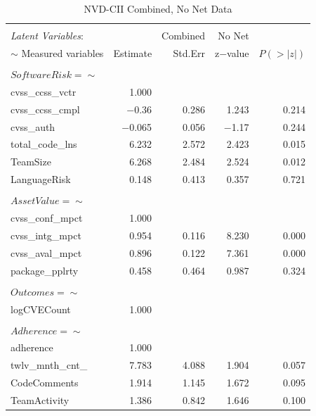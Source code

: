 \begin{table}
	\begin{center}	
		\caption{NVD-CII Combined, No Net Data}
		\label{tab:results_combined1}
		\begin{tabular}{l|rrrr}
			\\[-1.8ex]\hline 
			\hline \\[-1.8ex] 
			\textit{Latent Variables}: &  & Combined & No Net & \\  
			$\sim$ Measured variables& Estimate & Std.Err & z$-$value & $P(>|z|)$ \\
			\hline \\[-1.8ex]
			$SoftwareRisk =\sim$  & & & & \\                                   
			cvss\_ccss\_vctr   & 1.000 & &  & \\                             
			cvss\_ccss\_cmpl &  $-$0.36 &   0.286 & 1.243 &   0.214\\
			cvss\_auth     &   $-$0.065  &  0.056  & $-$1.17   & 0.244\\
			total\_code\_lns  &  6.232 &   2.572 &   2.423 &   0.015\\
			TeamSize        &  6.268   & 2.484   & 2.524   & 0.012\\
			LanguageRisk    &  0.148  &  0.413   & 0.357   & 0.721\\ 
			& & & & \\  
			$AssetValue =\sim$     & & & & \\                                    		
		    cvss\_conf\_mpct  &  1.000  &	&	&                  \\
		    cvss\_intg\_mpct  &  0.954  &  0.116 &   8.230  &  0.000\\
		    cvss\_aval\_mpct  &  0.896 &   0.122 &   7.361 &   0.000\\
		    package\_pplrty  &  0.458 &   0.464  &  0.987 &   0.324\\	
			& & & & \\  
			$Outcomes =\sim$    & & & & \\                                     
			logCVECount     &  1.000  & & & \\                          
			& & & & \\  
			$Adherence =\sim$   & & & & \\                                      
			adherence    &     1.000        & & & \\    
			
		    twlv\_mnth\_cnt\_  &  7.783  &  4.088  &  1.904 &   0.057\\
		    CodeComments    &  1.914  &  1.145  &  1.672  &  0.095\\
		    TeamActivity    &  1.386  &  0.842 &   1.646 &   0.100\\	
			                

\end{tabular}
\end{center}
\end{table}
